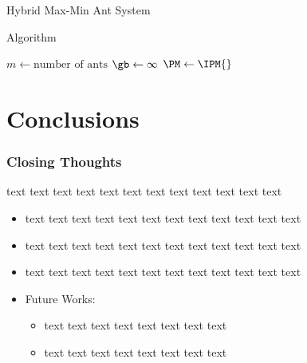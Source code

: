 \documentclass[aspectratio=169]{beamer}
\begin{document}
		\begin{frame}{Hybrid Max-Min Ant System}
			\begin{block}{Algorithm}
				\setlength{\interspacetitleruled}{0pt}%
				\setlength{\algotitleheightrule}{0pt}%
				\begin{algorithm}[H]
					\let\emptyset\varnothing
					\tiny
					\label{alg:maxmin}
					\DontPrintSemicolon
					$m \gets \mbox{number of ants}$\;
					$\gb \gets \infty$\;
					$\PM \gets \IPM{}$\;
					\Return \gb
				\end{algorithm}
			\end{block}
		\end{frame}
		
	\section{Conclusions}
		\begin{frame}
			\frametitle{Closing Thoughts}
			text text text text text text text text text text text text
			\begin{itemize}
				\item text text text text text text text text text text text text
				\item text text text text text text text text text text text text
				\item text text text text text text text text text text text text
				\item Future Works:
				\begin{itemize}
					\item text text text text text text text text 
					\item text text text text text text text text
				\end{itemize}
			\end{itemize}
		\end{frame}
	
		\frame{\acknowledgmentpage}
\end{document}
